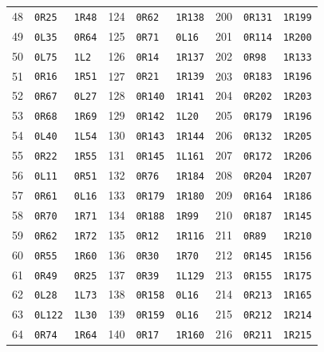 \begin{longtable}{rll@{\hspace{8mm}}rll@{\hspace{8mm}}rll}
48 & \texttt{0R25} & \texttt{1R48} & 124 & \texttt{0R62} & \texttt{1R138} & 200 & \texttt{0R131} & \texttt{1R199} \\
49 & \texttt{0L35} & \texttt{0R64} & 125 & \texttt{0R71} & \texttt{0L16} & 201 & \texttt{0R114} & \texttt{1R200} \\
50 & \texttt{0L75} & \texttt{1L2} & 126 & \texttt{0R14} & \texttt{1R137} & 202 & \texttt{0R98} & \texttt{1R133} \\
51 & \texttt{0R16} & \texttt{1R51} & 127 & \texttt{0R21} & \texttt{1R139} & 203 & \texttt{0R183} & \texttt{1R196} \\
52 & \texttt{0R67} & \texttt{0L27} & 128 & \texttt{0R140} & \texttt{1R141} & 204 & \texttt{0R202} & \texttt{1R203} \\
53 & \texttt{0R68} & \texttt{1R69} & 129 & \texttt{0R142} & \texttt{1L20} & 205 & \texttt{0R179} & \texttt{1R196} \\
54 & \texttt{0L40} & \texttt{1L54} & 130 & \texttt{0R143} & \texttt{1R144} & 206 & \texttt{0R132} & \texttt{1R205} \\
55 & \texttt{0R22} & \texttt{1R55} & 131 & \texttt{0R145} & \texttt{1L161} & 207 & \texttt{0R172} & \texttt{1R206} \\
56 & \texttt{0L11} & \texttt{0R51} & 132 & \texttt{0R76} & \texttt{1R184} & 208 & \texttt{0R204} & \texttt{1R207} \\
57 & \texttt{0R61} & \texttt{0L16} & 133 & \texttt{0R179} & \texttt{1R180} & 209 & \texttt{0R164} & \texttt{1R186} \\
58 & \texttt{0R70} & \texttt{1R71} & 134 & \texttt{0R188} & \texttt{1R99} & 210 & \texttt{0R187} & \texttt{1R145} \\
59 & \texttt{0R62} & \texttt{1R72} & 135 & \texttt{0R12} & \texttt{1R116} & 211 & \texttt{0R89} & \texttt{1R210} \\
60 & \texttt{0R55} & \texttt{1R60} & 136 & \texttt{0R30} & \texttt{1R70} & 212 & \texttt{0R145} & \texttt{1R156} \\
61 & \texttt{0R49} & \texttt{0R25} & 137 & \texttt{0R39} & \texttt{1L129} & 213 & \texttt{0R155} & \texttt{1R175} \\
62 & \texttt{0L28} & \texttt{1L73} & 138 & \texttt{0R158} & \texttt{0L16} & 214 & \texttt{0R213} & \texttt{1R165} \\
63 & \texttt{0L122} & \texttt{1L30} & 139 & \texttt{0R159} & \texttt{0L16} & 215 & \texttt{0R212} & \texttt{1R214} \\
64 & \texttt{0R74} & \texttt{1R64} & 140 & \texttt{0R17} & \texttt{1R160} & 216 & \texttt{0R211} & \texttt{1R215} \\

\end{longtable}
